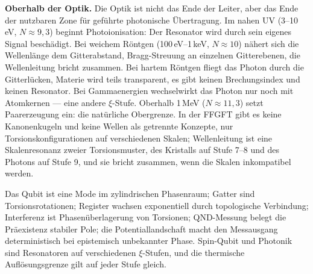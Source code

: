 \textbf{Oberhalb der Optik.} Die Optik ist nicht das Ende der Leiter,
aber das Ende der nutzbaren Zone für geführte photonische Übertragung.
Im nahen UV (3--10\,eV, $N\approx9{,}3$) beginnt Photoionisation: Der
Resonator wird durch sein eigenes Signal beschädigt. Bei weichem Röntgen
(100\,eV--1\,keV, $N\approx10$) nähert sich die Wellenlänge dem
Gitterabstand, Bragg-Streuung an einzelnen Gitterebenen, die
Wellenleitung bricht zusammen. Bei hartem Röntgen fliegt das Photon
durch die Gitterlücken, Materie wird teils transparent, es gibt keinen
Brechungsindex und keinen Resonator. Bei Gammaenergien wechselwirkt das
Photon nur noch mit Atomkernen --- eine andere $\xi$-Stufe. Oberhalb
1\,MeV ($N\approx11{,}3$) setzt Paarerzeugung ein: die natürliche
Obergrenze. In der FFGFT gibt es keine Kanonenkugeln und keine Wellen als
getrennte Konzepte, nur Torsionskonfigurationen auf verschiedenen Skalen;
Wellenleitung ist eine Skalenresonanz zweier Torsionsmuster, des
Kristalls auf Stufe 7--8 und des Photons auf Stufe 9, und sie bricht
zusammen, wenn die Skalen inkompatibel werden.

\begin{keypoint}
Das Qubit ist eine Mode im zylindrischen Phasenraum; Gatter sind
Torsionsrotationen; Register wachsen exponentiell durch topologische
Verbindung; Interferenz ist Phasenüberlagerung von Torsionen; QND-Messung
belegt die Präexistenz stabiler Pole; die Potentiallandschaft macht den
Messausgang deterministisch bei epistemisch unbekannter Phase. Spin-Qubit
und Photonik sind Resonatoren auf verschiedenen $\xi$-Stufen, und die
thermische Auflösungsgrenze gilt auf jeder Stufe gleich.
\end{keypoint}

